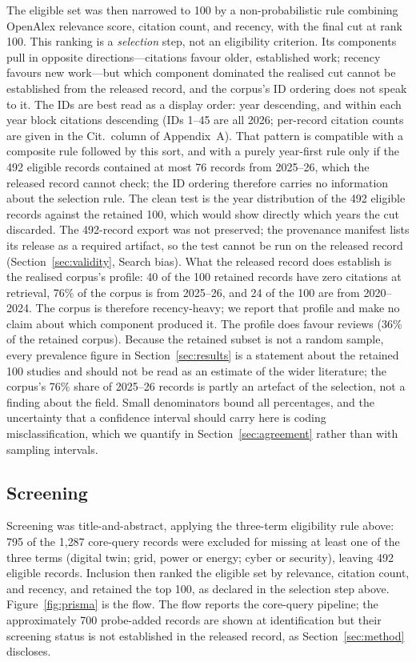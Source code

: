 \documentclass[preprint,12pt]{elsarticle}
\renewcommand{\_}{\plainunderscore\allowbreak}
\begin{document}
The eligible set was then narrowed to 100 by a non-probabilistic rule combining OpenAlex
relevance score, citation count, and recency, with the final cut at rank 100. This ranking
is a \emph{selection} step, not an eligibility criterion. Its components pull in opposite
directions---citations favour older, established work; recency favours new work---but
which component dominated the realised cut cannot be established from the released
record, and the corpus's ID ordering does not speak to it. The IDs are best read as a
display order: year descending, and within each year block citations descending (IDs
1--45 are all 2026; per-record citation counts are given in the Cit.\ column of
Appendix~A). That pattern is compatible with a composite rule followed by this sort,
and with a purely year-first rule only if the 492 eligible records contained at most 76
records from 2025--26, which the released record cannot check; the ID ordering therefore
carries no information about the selection rule. The clean test is the year distribution
of the 492 eligible records against the retained 100, which would show directly which
years the cut discarded. The 492-record export was not preserved; the provenance
manifest lists its release as a required artifact, so the test cannot be run on the
released record (Section~\ref{sec:validity}, Search bias). What the released record does
establish is the realised corpus's profile: 40 of the 100 retained records have zero
citations at retrieval, 76\% of the corpus is from 2025--26, and 24 of the 100 are from
2020--2024. The corpus is therefore recency-heavy; we report that profile and make no
claim about which component produced it. The profile does favour reviews (36\% of the
retained corpus). Because the retained subset is not a random sample, every prevalence
figure in Section~\ref{sec:results} is a statement about the retained 100 studies and
should not be read as an estimate of the wider literature; the corpus's 76\% share of
2025--26 records is partly an artefact of the selection, not a finding about the field.
Small denominators bound all percentages, and the uncertainty that a confidence interval
should carry here is coding misclassification, which we quantify in Section~\ref{sec:agreement}
rather than with sampling intervals.

\subsection{Screening}

Screening was title-and-abstract, applying the three-term eligibility rule above: 795 of
the 1{,}287 core-query records were excluded for missing at least one of the three terms
(digital twin; grid, power or energy; cyber or security), leaving 492 eligible records.
Inclusion then ranked the eligible set by relevance, citation count, and recency, and
retained the top 100, as declared in the selection step above. Figure~\ref{fig:prisma} is
the flow. The flow reports the core-query pipeline; the approximately 700 probe-added
records are shown at identification but their screening status is not established in the
released record, as Section~\ref{sec:method} discloses.
\end{document}
